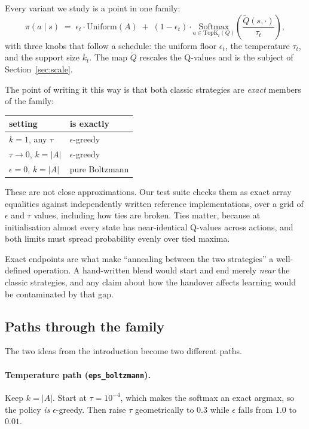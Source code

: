 \documentclass[11pt,a4paper]{article}
\begin{document}
Every variant we study is a point in one family:
\begin{equation}
\pi(a \mid s) \;=\;
\epsilon_t \cdot \mathrm{Uniform}(A)
\;+\;
(1 - \epsilon_t)\cdot
\underset{a \in \mathrm{TopK}_t(Q)}{\mathrm{Softmax}}
\!\left(\frac{\tilde{Q}(s,\cdot)}{\tau_t}\right),
\label{eq:family}
\end{equation}
with three knobs that follow a schedule: the uniform floor $\epsilon_t$, the
temperature $\tau_t$, and the support size $k_t$. The map $\tilde{Q}$ rescales
the Q-values and is the subject of Section~\ref{sec:scale}.

The point of writing it this way is that both classic strategies are
\emph{exact} members of the family:

\begin{center}
\begin{tabular}{ll}
\toprule
setting & is exactly \\
\midrule
$k = 1$, any $\tau$ & $\epsilon$-greedy \\
$\tau \to 0$, $k = |A|$ & $\epsilon$-greedy \\
$\epsilon = 0$, $k = |A|$ & pure Boltzmann \\
\bottomrule
\end{tabular}
\end{center}

These are not close approximations. Our test suite checks them as exact array
equalities against independently written reference implementations, over a grid
of $\epsilon$ and $\tau$ values, including how ties are broken. Ties matter,
because at initialisation almost every state has near-identical Q-values across
actions, and both limits must spread probability evenly over tied maxima.

Exact endpoints are what make ``annealing between the two strategies'' a
well-defined operation. A hand-written blend would start and end merely
\emph{near} the classic strategies, and any claim about how the handover
affects learning would be contaminated by that gap.

\subsection{Paths through the family}

The two ideas from the introduction become two different paths.

\paragraph{Temperature path (\texttt{eps\_boltzmann}).}
Keep $k = |A|$. Start at $\tau = 10^{-4}$, which makes the softmax an exact
argmax, so the policy \emph{is} $\epsilon$-greedy. Then raise $\tau$
geometrically to $0.3$ while $\epsilon$ falls from $1.0$ to $0.01$.
\end{document}
